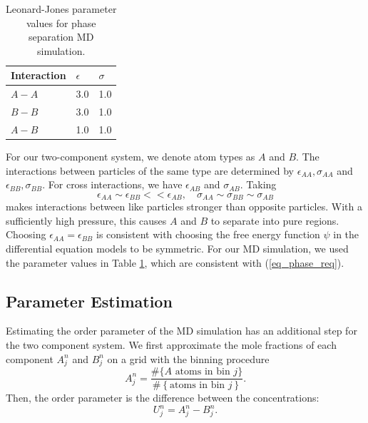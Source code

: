 \documentclass[12pt, reqno]{report}
\theoremstyle{definition}
\theoremstyle{remark}
\begin{document}
\begin{table}
    
    \centering
    \begin{tabular}{|l|l|l|}
        \hline
        Interaction & $\epsilon$ & $\sigma$ \\
        \hline
        $A-A$ & 3.0 & 1.0 \\
        \hline
        $B-B$ & 3.0 & 1.0 \\
        \hline
        $A-B$ & 1.0 & 1.0 \\
        \hline
    \end{tabular}

    \caption{Leonard-Jones parameter values for phase separation MD simulation.}
    \label{tb_lj_phase}
\end{table}
For our two-component system, we denote atom types as $A$ and $B$. 
The interactions between particles of the same type are determined by $\epsilon_{AA},\sigma_{AA}$ and $\epsilon_{BB },\sigma_{BB}$. 
For cross interactions, we have $\epsilon_{AB }$ and $\sigma_{AB}$. 
Taking 
\begin{equation} \label{eq_phase_req}
    \epsilon_{AA}\sim\epsilon_{BB}<<\epsilon_{AB},\quad \sigma_{AA}\sim\sigma_{BB}\sim\sigma_{AB}
\end{equation}
makes interactions between like particles stronger than opposite particles. 
With a sufficiently high pressure, this causes $A$ and $B$ to separate into pure regions.
Choosing $\epsilon_{AA}=\epsilon_{BB}$ is consistent with choosing the free energy function $\psi$ in the differential equation models to be symmetric.
For our MD simulation, we used the parameter values in Table \ref{tb_lj_phase}, which are consistent with (\ref{eq_phase_req}).


\subsection{Parameter Estimation} \label{ssec_phase_estim}


Estimating the order parameter of the MD simulation has an additional step for the two component system.
We first approximate the mole fractions of each component $A_j^n$ and $B_j^n$ on a grid with the binning procedure
\begin{equation}
    A_j^n=\frac{\#\{A\text{ atoms in bin }j\}}{\#\left\{  \text{atoms in bin }j\right\}}.
\end{equation}
Then, the order parameter is the difference between the concentrations:
\begin{equation}
    U_j^n=A_j^n-B_j^n.
\end{equation}
\end{document}
